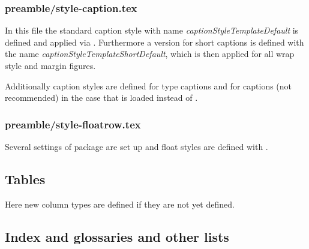 
\subsubsection{preamble/style-caption.tex}

In this file the standard caption style with name \emph{captionStyleTemplateDefault} is defined and applied via . Furthermore a version for short captions is defined with the name \emph{captionStyleTemplateShortDefault}, which is then applied for all wrap style and margin figures.

Additionally caption styles are defined for  type captions and for  captions (not recommended) in the case that  is loaded instead of .


\subsubsection{preamble/style-floatrow.tex}

Several settings of package  are set up and float styles are defined with .



\subsection{Tables}
\label{sec:style:tables}

Here new column types are defined if they are not yet defined.


\subsection{Index and glossaries and other lists}
\label{sec:style:index}

